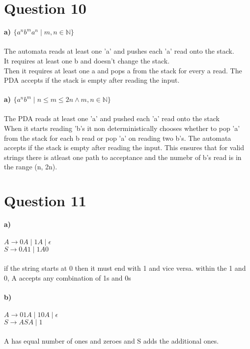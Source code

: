 \documentclass[11pt]{article}
\begin{document}
\section*{Question 10}
\textbf{a) $\{a^nb^ma^n \;|\; m, n \in \mathbb{N}\}$} \\
\\
The automata reads at least one 'a' and pushes each 'a' read onto the stack. \\
It requires at least one b and doesn't change the stack. \\
Then it requires at least one a and pops a from the stack for every a read.
The PDA accepts if the stack is empty after reading the input. \\
\\
\textbf{a) $\{a^nb^m \;|\; n \leq m \leq 2n \land m, n \in \mathbb{N}\}$} \\
\\
The PDA reads at least one 'a' and pushed each 'a' read onto the stack \\
When it starts reading 'b's it non deterministically chooses whether to pop 'a'
from the stack for each b read or pop 'a' on reading two b's. The automata accepts
if the stack is empty after reading the input. This ensures that for valid strings
there is atleast one path to acceptance and the numebr of b's read is in the range
(n, 2n).

\section*{Question 11}
\textbf{a)} \\
\\
$A \rightarrow 0A \;|\; 1A \;|\; \epsilon $ \\
$S \rightarrow 0A1 \;|\; 1A0 $ \\
\\
if the string starts at 0 then it must end with 1 and vice versa.
within the 1 and 0, A accepts any combination of 1s and 0s \\
\\
\textbf{b)} \\
\\
$A \rightarrow 01A \;|\; 10A \;|\; \epsilon$ \\
$S \rightarrow ASA \;|\; 1$ \\
\\
A has equal number of ones and zeroes and S adds the additional ones.
\end{document}
